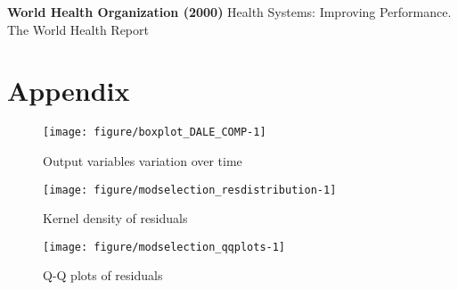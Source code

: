 \documentclass[12pt,a4paper]{article}\usepackage[]{graphicx}\usepackage[]{color}
\newenvironment{knitrout}{}{} %
\begin{document}
\textbf{World Health Organization (2000)} Health Systems: Improving Performance. The World Health Report



\newpage
\section{Appendix}


\begin{knitrout}
\color{fgcolor}\begin{figure}[htbp]

{\centering \texttt{[image: figure/boxplot\_DALE\_COMP-1]} 

}

\caption[Output variables variation over time]{Output variables variation over time}\label{fig:boxplot_DALE_COMP}
\end{figure}


\end{knitrout}

\begin{knitrout}
\color{fgcolor}\begin{figure}[htbp]

{\centering \texttt{[image: figure/modselection\_resdistribution-1]} 

}

\caption[Kernel density of residuals]{Kernel density of residuals}\label{fig:modselection_resdistribution}
\end{figure}


\end{knitrout}

\begin{knitrout}
\color{fgcolor}\begin{figure}[htbp]

{\centering \texttt{[image: figure/modselection\_qqplots-1]} 

}

\caption[Q-Q plots of residuals]{Q-Q plots of residuals}\label{fig:modselection_qqplots}
\end{figure}


\end{knitrout}









\end{document}
